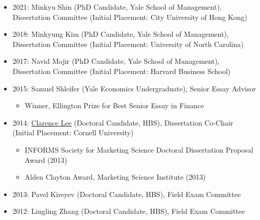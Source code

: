 \documentclass[margin, line, centered, 10pt]{res}
\begin{document}
\begin{resume}
\begin{itemize}
\item 2021: Minkyu Shin (PhD Candidate, Yale School of Management), Dissertation Committee (Initial Placement: City University of Hong Kong)
\item 2018: Minkyung Kim (PhD Candidate, Yale School of Management), Dissertation Committee (Initial Placement: University of North Carolina)
\item 2017: Navid Mojir (PhD Candidate, Yale School of Management), Dissertation Committee (Initial Placement: Harvard Business School)
\item 2015: Samuel Shleifer (Yale Economics Undergraduate),  Senior Essay Advisor
\begin{itemize}
\item Winner, Ellington Prize for Best Senior Essay in Finance%
\end{itemize}
\item 2014: \href{http://www.johnson.cornell.edu/Faculty-And-Research/Profile?id=cl2278}{Clarence Lee} (Doctoral Candidate, HBS), Dissertation Co-Chair\\
(Initial Placement: Cornell University)
\begin{itemize}
\item INFORMS Society for Marketing Science Doctoral Dissertation Proposal Award (2013)
\item Alden Clayton Award, Marketing Science Institute (2013)
\end{itemize}
\item 2013: Pavel Kireyev (Doctoral Candidate, HBS), Field Exam Committee
\item 2012: Lingling Zhang (Doctoral Candidate, HBS), Field Exam Committee
\end{itemize}



\end{resume}
\end{document}

